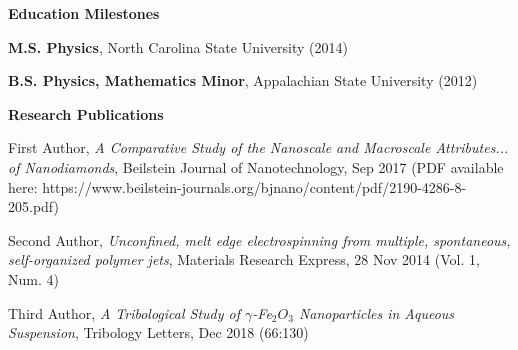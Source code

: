 \documentclass[letterpaper,final]{memoir}
\newcommand{\Sep}{\vspace{1.0em}}
\newcommand{\SmallSep}{\vspace{0.4em}}
\newcommand{\CVSection}[1]
	{\LARGE\textbf{#1}\par
	\SmallSep\normalsize}
\begin{document}
\newpage



\notoserif \CVSection{Education Milestones}
\normalfont
\Sep
\begin{compactitem}[\color{Blue}$\circ$]

\item \textbf{M.S. Physics}, North Carolina State University (2014)
\SmallSep

\item \textbf{B.S. Physics, Mathematics Minor}, Appalachian State University (2012)

\end{compactitem}
\Sep



\notoserif \CVSection{Research Publications}
\normalfont

\Sep

\begin{compactitem}[\color{Blue}$\circ$]

    \item First Author, \textit{A Comparative Study of the Nanoscale and Macroscale Attributes... of Nanodiamonds}, Beilstein Journal of Nanotechnology, Sep 2017 (PDF available here: https://www.beilstein-journals.org/bjnano/content/pdf/2190-4286-8-205.pdf)
    \SmallSep

    \item Second Author, \textit{Unconfined, melt edge electrospinning from multiple, spontaneous, self-organized polymer jets}, Materials Research Express, 28 Nov 2014 (Vol. 1, Num. 4)
    \SmallSep

    \item Third Author, \textit{A Tribological Study of $\gamma$-Fe$_{2}O_{3}$ Nanoparticles in Aqueous Suspension}, Tribology Letters, Dec 2018 (66:130)

\end{compactitem}
\end{document}
